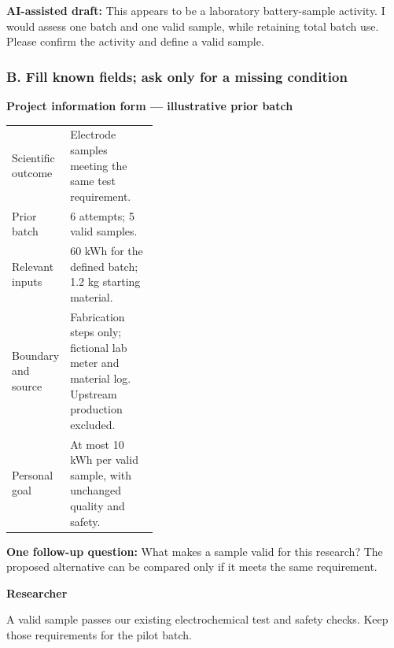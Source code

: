 \begin{assessscreen}
\textbf{AI-assisted draft:} This appears to be a laboratory battery-sample activity. I would assess one batch and one valid sample, while retaining total batch use. Please confirm the activity and define a valid sample.\par\medskip
{}\quad
{}\quad
{}
\end{assessscreen}

\subsubsection*{B. Fill known fields; ask only for a missing condition}
\begin{assessscreen}
\textbf{Project information form --- illustrative prior batch}\par
\begin{tabularx}{\linewidth}{@{}>{\raggedright\arraybackslash}p{0.37\linewidth}X@{}}
Scientific outcome & Electrode samples meeting the same test requirement. \\
Prior batch & 6 attempts; 5 valid samples. \\
Relevant inputs & 60 kWh for the defined batch; 1.2 kg starting material. \\
Boundary and source & Fabrication steps only; fictional lab meter and material log. Upstream production excluded. \\
Personal goal & At most 10 kWh per valid sample, with unchanged quality and safety. \\
\end{tabularx}
\medskip{}\quad
{}\quad
{}
\end{assessscreen}

\begin{assessscreen}
\textbf{One follow-up question:} What makes a sample valid for this research? The proposed alternative can be compared only if it meets the same requirement.
\end{assessscreen}
\begin{flushright}\begin{assessuser}
\textbf{Researcher}\par
A valid sample passes our existing electrochemical test and safety checks. Keep those requirements for the pilot batch.
\end{assessuser}\end{flushright}

